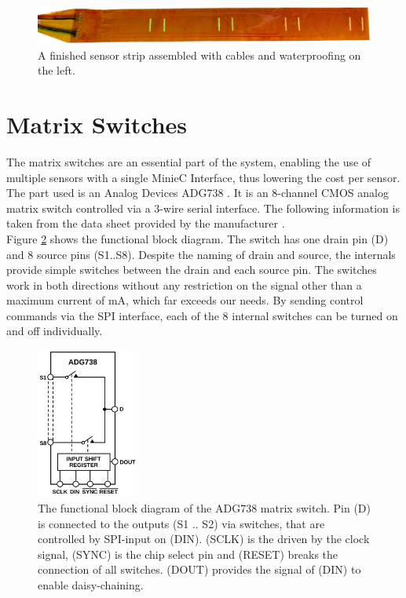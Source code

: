 \begin{figure}
	\begin{center}
		\includegraphics[width=\textwidth]{images/fpcbp.jpg} 
		\caption{A finished sensor strip assembled with cables and waterproofing on the left.}
		\label{fig:fpcbp}
	\end{center}
\end{figure}

\section{Matrix Switches}

The matrix switches are an essential part of the system, enabling the use of multiple sensors with a single MinieC Interface, thus lowering the cost per sensor. The part used is an Analog Devices ADG738 . It is an 8-channel CMOS analog matrix switch controlled via a 3-wire serial interface. The following information is taken from the data sheet provided by the manufacturer \textcite{ms}.\\

Figure \ref{fig:ms} shows the functional block diagram. The switch has one drain pin (D) and 8 source pins (S1..S8). Despite the naming of drain and source, the internals provide simple switches between the drain and each source pin. The switches work in both directions without any restriction on the signal other than a maximum current of \unit[120]{mA}, which far exceeds our needs. By sending control commands via the SPI interface, each of the 8 internal switches can be turned on and off individually.\\

\begin{figure}
	\begin{center}
		\includegraphics[width=0.3\textwidth]{images/ms.pdf} 
		\caption[The functional block diagram of the ADG738 matrix switch.]{The functional block diagram of the ADG738 matrix switch. Pin (D) is connected to the outputs (S1 .. S2) via switches, that are controlled by SPI-input on (DIN). (SCLK) is the driven by the clock signal, (SYNC) is the chip select pin and (RESET) breaks the connection of all switches. (DOUT) provides the signal of (DIN) to enable daisy-chaining.}
		\label{fig:ms}
	\end{center}
\end{figure}

